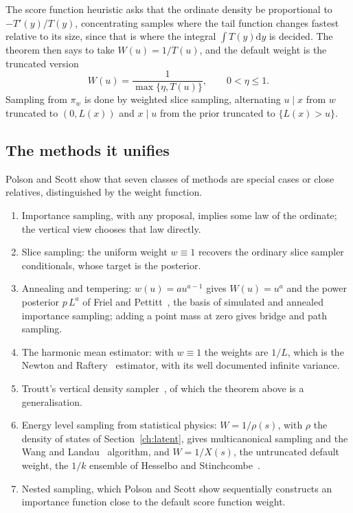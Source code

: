 The score function heuristic asks that the ordinate density be proportional to $-T'(y)/T(y)$, concentrating samples where the tail function changes fastest relative to its size, since that is where the integral $\int T(y)\mathrm dy$ is decided. The theorem then says to take $W(u)=1/T(u)$, and the default weight is the truncated version
\[
W(u)=\frac{1}{\max\{\eta,T(u)\}},\qquad 0<\eta\le1 .
\]
Sampling from $\pi_w$ is done by weighted slice sampling, alternating $u\mid x$ from $w$ truncated to $(0,L(x))$ and $x\mid u$ from the prior truncated to $\{L(x)>u\}$.

\subsection{The methods it unifies}

Polson and Scott \cite{PSvl} show that seven classes of methods are special cases or close relatives, distinguished by the weight function.
\begin{enumerate}
\item Importance sampling, with any proposal, implies some law of the ordinate; the vertical view chooses that law directly.
\item Slice sampling: the uniform weight $w\equiv1$ recovers the ordinary slice sampler conditionals, whose target is the posterior.
\item Annealing and tempering: $w(u)=au^{a-1}$ gives $W(u)=u^a$ and the power posterior $p\,L^a$ of Friel and Pettitt~\cite{FP08}, the basis of simulated and annealed importance sampling; adding a point mass at zero gives bridge and path sampling.
\item The harmonic mean estimator: with $w\equiv1$ the weights are $1/L$, which is the Newton and Raftery~\cite{NR94} estimator, with its well documented infinite variance.
\item Troutt's vertical density sampler~\cite{Tr91}, of which the theorem above is a generalisation.
\item Energy level sampling from statistical physics: $W=1/\rho(s)$, with $\rho$ the density of states of Section~\ref{ch:latent}, gives multicanonical sampling and the Wang and Landau~\cite{WL01} algorithm, and $W=1/X(s)$, the untruncated default weight, the $1/k$ ensemble of Hesselbo and Stinchcombe~\cite{HS95}.
\item Nested sampling, which Polson and Scott show sequentially constructs an importance function close to the default score function weight.
\end{enumerate}

